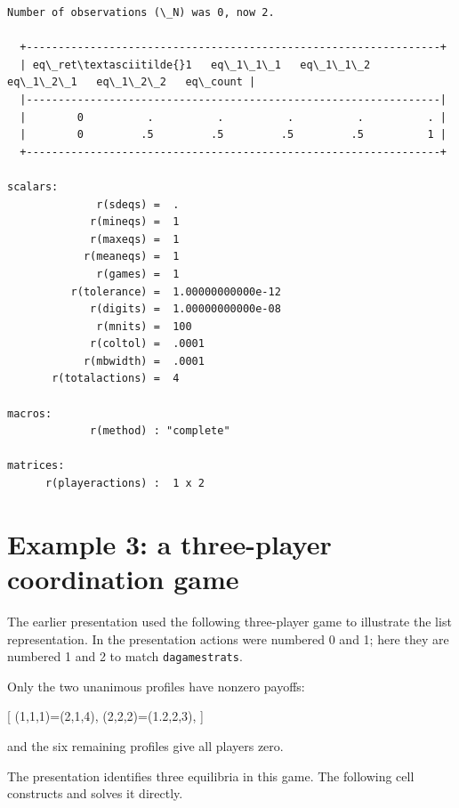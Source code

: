 \documentclass[11pt]{article}
\begin{document}
    \begin{Verbatim}[commandchars=\\\{\}]
Number of observations (\_N) was 0, now 2.

  +-----------------------------------------------------------------+
  | eq\_ret\textasciitilde{}1   eq\_1\_1\_1   eq\_1\_1\_2   eq\_1\_2\_1   eq\_1\_2\_2   eq\_count |
  |-----------------------------------------------------------------|
  |        0          .          .          .          .          . |
  |        0         .5         .5         .5         .5          1 |
  +-----------------------------------------------------------------+

scalars:
              r(sdeqs) =  .
             r(mineqs) =  1
             r(maxeqs) =  1
            r(meaneqs) =  1
              r(games) =  1
          r(tolerance) =  1.00000000000e-12
             r(digits) =  1.00000000000e-08
              r(mnits) =  100
             r(coltol) =  .0001
            r(mbwidth) =  .0001
       r(totalactions) =  4

macros:
             r(method) : "complete"

matrices:
      r(playeractions) :  1 x 2
    \end{Verbatim}

    \section{Example 3: a three-player coordination
game}\label{example-3-a-three-player-coordination-game}

The earlier presentation used the following three-player game to
illustrate the list representation. In the presentation actions were
numbered 0 and 1; here they are numbered 1 and 2 to match
\texttt{dagamestrats}.

Only the two unanimous profiles have nonzero payoffs:

{[} \Pi(1,1,1)=(2,1,4), \qquad \Pi(2,2,2)=(1.2,2,3), {]}

and the six remaining profiles give all players zero.

The presentation identifies three equilibria in this game. The following
cell constructs and solves it directly.
\end{document}
